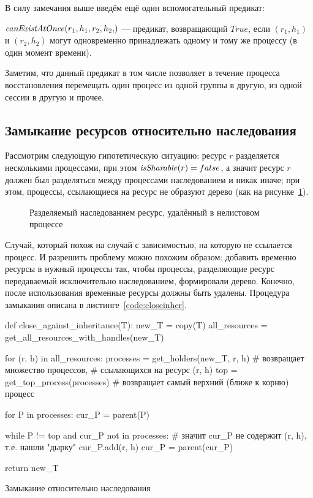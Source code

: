 В силу замечания выше введём ещё один вспомогательный предикат:

\begin{defn}
$\canExistAtOnce{r_1, h_1, r_2, h_2}$ --- предикат, возвращающий $True$, если $(r_1, h_1)$ и $(r_2, h_2)$ могут одновременно принадлежать одному и тому же процессу (в один момент времени).
\end{defn}

\begin{note}
Заметим, что данный предикат в том числе позволяет в течение процесса восстановления перемещать один процесс из одной группы в другую, из одной сессии в другую и прочее.
\end{note}

\subsection{Замыкание ресурсов относительно наследования}

Рассмотрим следующую гипотетическую ситуацию: ресурс $r$ разделяется несколькими процессами, при этом $\text{\textit{isSharable}}(r) = false$, а значит ресурс $r$ должен был разделяться между процессами наследованием и никак иначе; при этом, процессы, ссылающиеся на ресурс не образуют дерево (как на рисунке~\ref{fig:inherithole}). 

\begin{figure}[ht!]
\centering
{}
\caption{Разделяемый наследованием ресурс, удалённый в нелистовом процессе}
\label{fig:inherithole}
\end{figure}

Случай, который похож на случай с зависимостью, на которую не ссылается процесс. И разрешить проблему можно похожим образом: добавить временно ресурсы в нужный процессы так, чтобы процессы, разделяющие ресурс передаваемый исключительно наследованием, формировали дерево. Конечно, после использования временные ресурсы должны быть удалены.
Процедура замыкания описана в листинге~\ref{code:closeinher}.

\begin{listing}[ht!]
\begin{pythoncode}
def close_against_inheritance(T):
    new_T = copy(T)
    all_resources = get_all_resources_with_handles(new_T)

    for (r, h) in all_resources:
        processes = get_holders(new_T, r, h)  # возвращает множество процессов, 
                                              # ссылающихся на ресурс (r, h)
        top = get_top_process(processes)  # возвращает самый верхний (ближе к корню) процесс

        for P in processes:
            cur_P = parent(P)

            while P != top and cur_P not in processes:
                # значит cur_P не содержит (r, h), т.е. нашли "дырку"
                cur_P.add(r, h)
                cur_P = parent(cur_P)

    return new_T
\end{pythoncode}

\caption{Замыкание относительно наследования}
\label{code:closeinher}
\end{listing}

